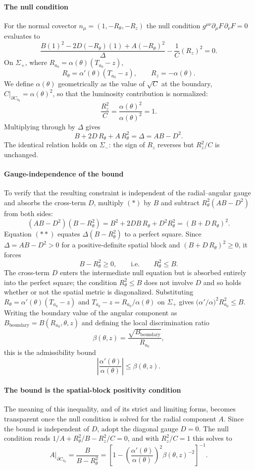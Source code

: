 \documentclass[preprint,12pt,authoryear]{elsarticle}
\theoremstyle{plain}
\theoremstyle{definition}
\theoremstyle{remark}
\begin{document}
\paragraph{The null condition}
For the normal covector $n_\mu=(1,-R_\theta,-R_z)$ the null condition $g^{\mu\nu}\partial_\mu F\,\partial_\nu F=0$ evaluates to
\[
\frac{B(1)^2-2D(-R_\theta)(1)+A(-R_\theta)^2}{\Delta}
-\frac{1}{C}(R_z)^2=0.
\]
On $\Sigma_+$, where $R_{a_0}=\alpha(\theta)(T_{a_0}-z)$,
\[
R_\theta=\alpha'(\theta)(T_{a_0}-z),
\qquad
R_z=-\alpha(\theta).
\]
We define $\alpha(\theta)$ geometrically as the value of $\sqrt{C}$ at the boundary, $C|_{\partial C_{a_0}}=\alpha(\theta)^2$, so that the luminosity contribution is normalized:
\[
\frac{R_z^2}{C}=\frac{\alpha(\theta)^2}{\alpha(\theta)^2}=1.
\]
Multiplying through by $\Delta$ gives
\[
B+2D\,R_\theta+A\,R_\theta^2
=
\Delta
=
AB-D^2.
\tag{$*$}
\]
The identical relation holds on $\Sigma_-$: the sign of $R_z$ reverses but $R_z^2/C$ is unchanged.

\paragraph{Gauge-independence of the bound}
To verify that the resulting constraint is independent of the radial--angular gauge and absorbs the cross-term $D$, multiply $(*)$ by $B$ and subtract $R_\theta^2(AB-D^2)$ from both sides:
\[
(AB-D^2)(B-R_\theta^2)
=
B^2+2DB\,R_\theta+D^2R_\theta^2
=
(B+D\,R_\theta)^2.
\tag{$**$}
\]
Equation $(**)$ equates $\Delta(B-R_\theta^2)$ to a perfect square. Since $\Delta=AB-D^2>0$ for a positive-definite spatial block and $(B+D\,R_\theta)^2\geq 0$, it forces
\[
B-R_\theta^2\geq 0,
\qquad\text{i.e.}\qquad
R_\theta^2\leq B.
\]
The cross-term $D$ enters the intermediate null equation but is absorbed entirely into the perfect square; the condition $R_\theta^2\leq B$ does not involve $D$ and so holds whether or not the spatial metric is diagonalized. Substituting $R_\theta=\alpha'(\theta)(T_{a_0}-z)$ and $T_{a_0}-z=R_{a_0}/\alpha(\theta)$ on $\Sigma_+$ gives $\bigl(\alpha'/\alpha\bigr)^2 R_{a_0}^2\leq B$. Writing the boundary value of the angular component as $B_{\mathrm{boundary}}=B(R_{a_0},\theta,z)$ and defining the local discrimination ratio
\[
\beta(\theta,z)=\frac{\sqrt{B_{\mathrm{boundary}}}}{R_{a_0}},
\]
this is the admissibility bound
\[
\boxed{\;
\left|\frac{\alpha'(\theta)}{\alpha(\theta)}\right|
\leq
\beta(\theta,z).
\;}
\]

\paragraph{The bound is the spatial-block positivity condition}
The meaning of this inequality, and of its strict and limiting forms, becomes transparent once the null condition is solved for the radial component $A$. Since the bound is independent of $D$, adopt the diagonal gauge $D=0$. The null condition reads $1/A+R_\theta^2/B-R_z^2/C=0$, and with $R_z^2/C=1$ this solves to
\[
A\big|_{\partial C_{a_0}}
=
\frac{B}{B-R_\theta^2}
=
\left[
1-
\left(\frac{\alpha'(\theta)}{\alpha(\theta)}\right)^2
\beta(\theta,z)^{-2}
\right]^{-1}.
\]
\end{document}
